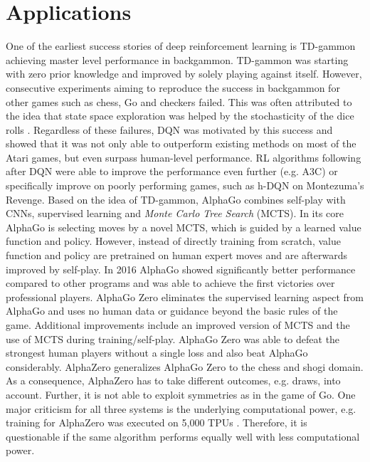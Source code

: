     \section{Applications \label{sec:applications}}
    \label{sec:games}
    One of the earliest success stories of deep reinforcement learning is TD-gammon \cite{Tesauro1994} achieving master level performance in backgammon.
    TD-gammon was starting with zero prior knowledge and improved by solely playing against itself.
    However, consecutive experiments aiming to reproduce the success in backgammon for other games such as chess, Go and checkers failed.
    This was often attributed to the idea that state space exploration was helped by the stochasticity of the dice rolls \cite{Pollack1997a}.
    Regardless of these failures, DQN was motivated by this success and showed that it was not only able to outperform existing methods on most of the Atari games, but even surpass human-level performance. 
    RL algorithms following after DQN were able to improve the performance even further (e.g. A3C) or specifically improve on poorly performing games, such as h-DQN on Montezuma's Revenge.
    Based on the idea of TD-gammon, AlphaGo \cite{Silver2016} combines self-play with CNNs, supervised learning and \textit{Monte Carlo Tree Search} (MCTS). 
    In its core AlphaGo is selecting moves by a novel MCTS, which is guided by a learned value function and policy.
    However, instead of directly training from scratch, value function and policy are pretrained on human expert moves and are afterwards improved by self-play.
    In 2016 AlphaGo showed significantly better performance compared to other programs and was able to achieve the first victories over professional players.
    AlphaGo Zero \cite{Silver2017a} eliminates the supervised learning aspect from AlphaGo and uses no human data or guidance beyond the basic rules of the game.
    Additional improvements include an improved version of MCTS and the use of MCTS during training/self-play.
    AlphaGo Zero was able to defeat the strongest human players without a single loss and also beat AlphaGo considerably.
    AlphaZero \cite{Silver2017} generalizes AlphaGo Zero to the chess and shogi domain.
    As a consequence, AlphaZero has to take different outcomes, e.g. draws, into account.
    Further, it is not able to exploit symmetries as in the game of Go.
    One major criticism for all three systems is the underlying computational power, e.g. training for AlphaZero was executed on 5,000 TPUs \cite{Jouppi2017}. 
    Therefore, it is questionable if the same algorithm performs equally well with less computational power.\\
